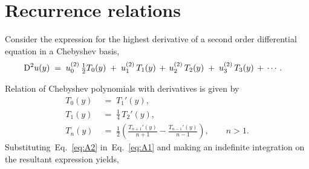 \documentclass[%
secnumarabic,%
 amssymb, amsmath,%
 aps,prf,superscriptaddress,longbibliography
frontmatterverbose,
]{revtex4-2}
\begin{document}
  \newpage\noindent

  \appendix
\section{Recurrence relations}\label{app:ind-int}
Consider the expression for the highest derivative of a second order differential equation in a Chebyshev basis,
\begin{align}\label{eq:A1}
  \mathrm D^2 u (y) \;&=\; u_0^{(2)} \,\tfrac{1}{2}T_0(y) \;+\; u_1^{(2)}\,T_1(y) \,+\, u_2^{(2)}\,T_2(y) \;+\; u_3^{(2)}\,T_3(y) \,+\, \cdots.
\end{align}

Relation of Chebyshev polynomials with derivatives is given by~\cite[Equation 3.25]{chebExpanExact}
\begin{subequations}\label{eq:A2}
\begin{align}
  T_0(y) \;&=\; T_1'(y),\\
  T_1(y) \;&=\; \tfrac{1}{4}\,T_2'(y),\\
  T_n(y) \;&=\; \tfrac{1}{2}\left( \frac{T_{n+1}'(y)}{n+1} - \frac{T_{n-1}'(y)}{n-1}\right), \qquad n > 1.
\end{align}
\end{subequations}
Substituting~Eq.~\eqref{eq:A2} in~Eq.~\eqref{eq:A1} and making an indefinite integration on the resultant expression yields,
\end{document}
